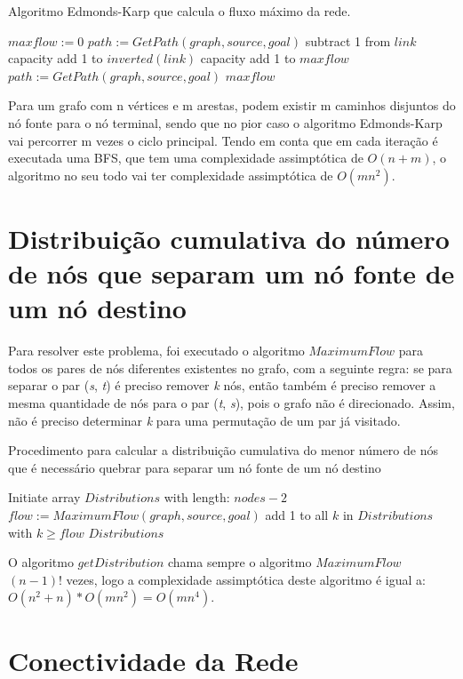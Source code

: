 \documentclass[12pt,a4paper]{article}
\begin{document}
\begin{algorithm}
\caption{Algoritmo Edmonds-Karp que calcula o fluxo máximo da rede.}\label{alg:residual_network}
\begin{algorithmic}[1]
    \State $maxflow := 0 $
    \State $path := GetPath(graph,source,goal)$
      		\State subtract 1 from $link$ capacity
        	\State add 1 to $inverted(link)$ capacity
      \EndFor
      \State add 1 to $maxflow$
      \State $path := GetPath(graph,source,goal)$
  	\EndWhile
  	\Return $maxflow$
\EndProcedure
\end{algorithmic}
\end{algorithm}

Para um grafo com n vértices e m arestas, podem existir m caminhos disjuntos do nó fonte para o nó terminal, sendo que no pior caso o algoritmo Edmonds-Karp vai percorrer m vezes o ciclo principal.
Tendo em conta que em cada iteração é executada uma BFS, que tem uma complexidade assimptótica de $O(n+m)$, o algoritmo no seu todo vai ter complexidade assimptótica de $O(m n^2)$.

\section{Distribuição cumulativa do número de nós que separam um nó fonte de um nó destino}

Para resolver este problema, foi executado o algoritmo $MaximumFlow$ para todos os pares de nós diferentes existentes no grafo, com a seguinte regra: se para separar o par (\textit{s}, \textit{t}) é preciso remover \textit{k} nós, então também é preciso remover a mesma quantidade de nós para o par (\textit{t}, \textit{s}), pois o grafo não é direcionado. Assim, não é preciso determinar \textit{k} para uma permutação de um par já visitado.

\begin{algorithm}
\caption{Procedimento para calcular a distribuição cumulativa do menor número de nós que é necessário quebrar para separar um nó fonte de um nó destino}\label{alg:distribution}
\begin{algorithmic}[1]
	\State Initiate array $Distributions$ with length: $nodes - 2$
          	  \State $flow := MaximumFlow(graph,source,goal)$
              	\State add 1 to all $k$ in $Distributions$ with $k \geq flow$
              \EndIf
      \EndFor
    \EndFor
  	\Return $Distributions$
\EndProcedure
\end{algorithmic}
\end{algorithm}

O algoritmo $getDistribution$ chama sempre o algoritmo $MaximumFlow$ $(n-1)!$ vezes, logo a complexidade assimptótica deste algoritmo é igual a: $O(n^2 + n) * O(m n^2) = O(m n^4)$.

\section{Conectividade da Rede}
\end{document}
